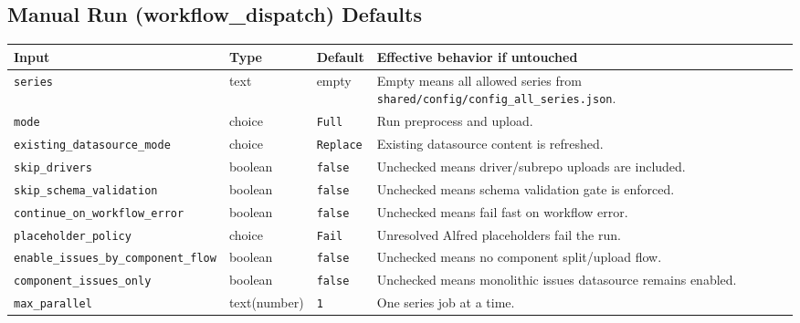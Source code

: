 \documentclass[11pt,a4paper]{article}
\begin{document}
\subsection{Manual Run (workflow\_dispatch) Defaults}
\begin{longtable}{|p{}|p{}|p{}|p{}|}
\hline
\textbf{Input} & \textbf{Type} & \textbf{Default} & \textbf{Effective behavior if untouched} \\
\hline
\texttt{series} & text & empty & Empty means all allowed series from \texttt{shared/config/config\_all\_series.json}. \\
\hline
\texttt{mode} & choice & \texttt{Full} & Run preprocess and upload. \\
\hline
\texttt{existing\_datasource\_mode} & choice & \texttt{Replace} & Existing datasource content is refreshed. \\
\hline
\texttt{skip\_drivers} & boolean & \texttt{false} & Unchecked means driver/subrepo uploads are included. \\
\hline
\texttt{skip\_schema\_validation} & boolean & \texttt{false} & Unchecked means schema validation gate is enforced. \\
\hline
\texttt{continue\_on\_workflow\_error} & boolean & \texttt{false} & Unchecked means fail fast on workflow error. \\
\hline
\texttt{placeholder\_policy} & choice & \texttt{Fail} & Unresolved Alfred placeholders fail the run. \\
\hline
\texttt{enable\_issues\_by\_component\_flow} & boolean & \texttt{false} & Unchecked means no component split/upload flow. \\
\hline
\texttt{component\_issues\_only} & boolean & \texttt{false} & Unchecked means monolithic issues datasource remains enabled. \\
\hline
\texttt{max\_parallel} & text(number) & \texttt{1} & One series job at a time. \\
\hline
\end{longtable}
\end{document}
